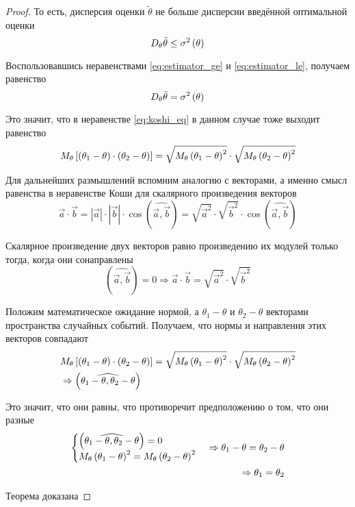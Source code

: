 \begin{proof}
    То есть, дисперсия оценки $\tilde{\theta}$ не больше дисперсии
    введённой оптимальной оценки
    \begin{equation}\label{eq:estimator_le}
        D_{\theta} \tilde{\theta}\le\sigma^2\left(\theta\right)
    \end{equation}

    Воспользовавшись неравенствами
    \eqref{eq:estimator_ge} и \eqref{eq:estimator_le}, получаем равенство
    $$D_{\theta} \tilde{\theta}=\sigma^2\left(\theta\right)$$

    Это значит, что в неравенстве \eqref{eq:koshi_eq}
    в данном случае тоже выходит равенство
    $$M_{\theta} \left[ \left( \theta_1-\theta \right)
            \cdot\left( \theta_2-\theta \right) \right]
        =\sqrt{M_{\theta} \left( \theta_1-\theta \right)^2}
            \cdot\sqrt{M_{\theta} \left( \theta_2-\theta \right)^2}$$

    Для дальнейших размышлений вспомним аналогию с векторами,
    а именно смысл равенства в неравенстве Коши
    для скалярного произведения векторов
    $$\vec{a}\cdot\vec{b}
        =\left|\vec{a}\right|\cdot\left|\vec{b}\right|
            \cdot\cos{\left(\widehat{\vec{a},\vec{b}}\right)}
        =\sqrt{\vec{a}^2}\cdot\sqrt{\vec{b}^2}
            \cdot\cos{\left(\widehat{\vec{a},\vec{b}}\right)}$$

    Скалярное произведение двух векторов равно произведению их модулей
    только тогда, когда они сонаправлены
    $$\left(\widehat{\vec{a},\vec{b}}\right)=0
        \Rightarrow \vec{a}\cdot\vec{b}
        =\sqrt{\vec{a}^2}\cdot\sqrt{\vec{b}^2}$$

    Положим математическое ожидание нормой,
    а $\theta_1-\theta$ и $\theta_2-\theta$ векторами
    пространства случайных событий.
    Получаем, что нормы и направления этих векторов совпадают
    \begin{align*}
        &M_{\theta} \left[ \left( \theta_1-\theta \right)
            \cdot\left( \theta_2-\theta \right) \right]
        =\sqrt{M_{\theta} \left( \theta_1-\theta \right)^2}
            \cdot\sqrt{M_{\theta} \left( \theta_2-\theta \right)^2}\\
        &\Rightarrow\left(\widehat{\theta_1-\theta,\theta_2-\theta}\right)\\
        \end{align*}

    Это значит, что они равны,
    что противоречит предположению о том, что они разные
    \begin{align*}
        \begin{cases}
            \left(\widehat{\theta_1-\theta,\theta_2-\theta}\right)=0\\
            M_{\theta} \left( \theta_1-\theta \right)^2
                =M_{\theta} \left( \theta_2-\theta \right)^2
        \end{cases}
        \Rightarrow \theta_1-\theta=\theta_2-\theta\\
        \Rightarrow\theta_1=\theta_2
    \end{align*}

    Теорема доказана
\end{proof}

